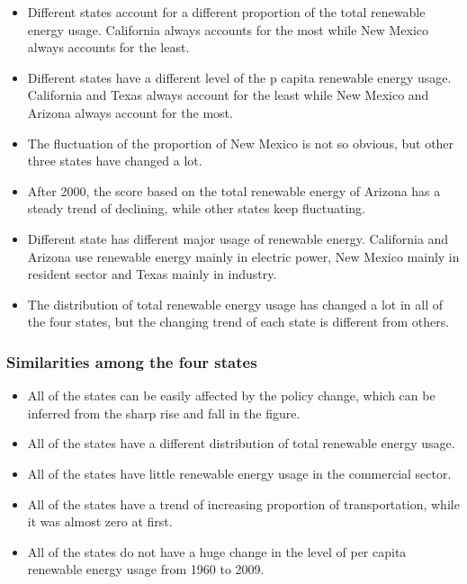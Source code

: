 \documentclass[a4paper,11pt]{article}
\begin{document}
\begin{itemize}
    \item Different states account for a different proportion of the total renewable energy usage. California always accounts for the most while New Mexico always accounts for the least.
    \item Different states have a different level of the p capita renewable energy usage. California and Texas always account for the least while New Mexico and Arizona always account for the most.
    \item The fluctuation of the proportion of New Mexico is not so obvious, but other three states have changed a lot.
    \item After 2000, the score based on the total renewable energy of Arizona has a steady trend of declining, while other states keep fluctuating.
    \item Different state has different major usage of renewable energy. California and Arizona use renewable energy mainly in electric power, New Mexico mainly in resident sector and Texas mainly in industry.
    \item The distribution of total renewable energy usage has changed a lot in all of the four states, but the changing trend of each state is different from others.
    
\end{itemize}

\subsubsection{Similarities among the four states}

\begin{itemize}
    \item All of the states can be easily affected by the policy change, which can be inferred from the sharp rise and fall in the figure.
    \item All of the states have a different distribution of total renewable energy usage.
    \item All of the states have little renewable energy usage in the commercial sector.
    \item All of the states have a trend of increasing proportion of transportation, while it was almost zero at first.
    \item All of the states do not have a huge change in the level of per capita renewable energy usage from 1960 to 2009.
\end{itemize}
\end{document}

